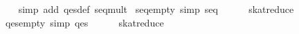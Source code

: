 \begin{isabellebody}
%
\isadelimproof
\ \ %
\endisadelimproof
%
\isatagproof
{}\isamarkupfalse%
\ {}simp\ add{}\ qes{}def\ seq{}mult{}%
\endisatagproof
{\isafoldproof}%
%
\isadelimproof
\isanewline
%
\endisadelimproof
\isanewline
{}\isamarkupfalse%
\ seq{}empty\ {}simp{}{}\ {}seq\ {}{}\ {}\ {}{}%
\isadelimproof
\ %
\endisadelimproof
%
\isatagproof
{}\isamarkupfalse%
\ skat{}reduce%
\endisatagproof
{\isafoldproof}%
%
\isadelimproof
%
\endisadelimproof
\isanewline
{}\isamarkupfalse%
\ qes{}empty\ {}simp{}{}\ {}qes\ {}{}\ {}\ {}{}%
\isadelimproof
\ %
\endisadelimproof
%
\isatagproof
{}\isamarkupfalse%
\ skat{}reduce%
\endisatagproof
{\isafoldproof}%
%
\isadelimproof
%
\endisadelimproof
\isanewline
%
\isadelimtheory
\isanewline
%
\endisadelimtheory
%
\isatagtheory
{}\isamarkupfalse%
%
\endisatagtheory
{\isafoldtheory}%
%
\isadelimtheory
%
\endisadelimtheory
\isanewline
\end{isabellebody}%
